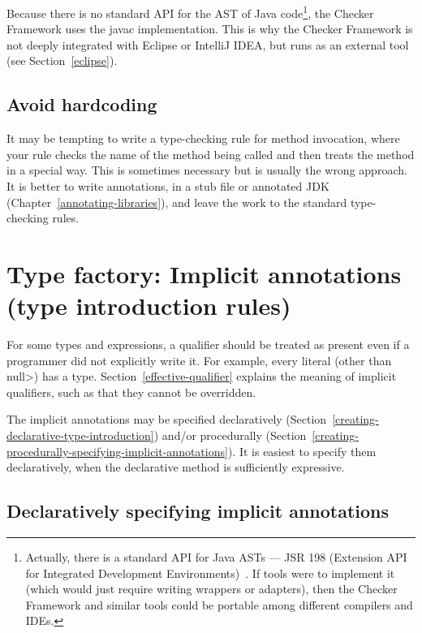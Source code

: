Because there is no standard API for the AST of Java
code\footnote{Actually, there is a standard API for Java ASTs --- JSR 198
  (Extension API for Integrated Development Environments)~\cite{JSR198}.
  If tools were to implement it (which would just require writing wrappers
  or adapters), then the Checker Framework and similar tools could be
  portable among different compilers and IDEs.}, the Checker Framework uses
the javac implementation.  This is why the Checker Framework is not deeply
integrated with Eclipse or IntelliJ IDEA, but runs as an external tool (see
Section~\ref{eclipse}).


\subsection{Avoid hardcoding\label{creating-avoid-hardcoding}}

It may be tempting to write a type-checking rule for method invocation,
where your rule checks the name of the method being called and then treats
the method in a special way.  This is sometimes necessary but is usually
the wrong approach.  It is better to write annotations, in a stub file
or annotated JDK (Chapter~\ref{annotating-libraries}),
and leave the work to the standard
type-checking rules.


\section{Type factory: Implicit annotations (type introduction rules)\label{creating-type-introduction}}

For some types and expressions, a qualifier should be treated as present
even if a programmer did not explicitly write it.  For example, every
literal (other than \<null>) has a  type.
Section~\ref{effective-qualifier} explains the meaning of implicit
qualifiers, such as that they cannot be overridden.

The implicit annotations may be specified declaratively
(Section~\ref{creating-declarative-type-introduction}) and/or procedurally
(Section~\ref{creating-procedurally-specifying-implicit-annotations}).
It is easiest to specify them declaratively, when the declarative method is
sufficiently expressive.


\subsection{Declaratively specifying implicit annotations\label{creating-declarative-type-introduction}}

